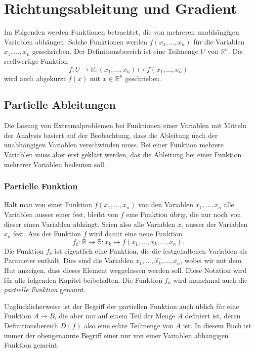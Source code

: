 %
%
%
\section{Richtungsableitung und Gradient
\label{buch:fuvar:section:richtungsableitung}}
Im Folgenden werden Funktionen betrachtet, die von mehreren unabhängigen
Variablen abhängen.
Solche Funktionen werden $f(x_1,\dots,x_n)$ für die Variablen
$x_1,\dots,x_n$ gesschrieben.
Der Definitionsbereich ist eine Teilmenge $U$ von $\mathbb{R}^n$.
Die reellwertige Funktion
\[
f\colon U\to\mathbb{R} : (x_1,\dots,x_n) \mapsto f(x_1,\dots, x_n)
\]
wird auch abgekürzt $f(x)$ mit $x\in\mathbb{R}^n$ geschrieben.

%
%
\subsection{Partielle Ableitungen}
Die Lösung von Extremalproblemen bei Funktionen einer Variablen
mit Mitteln der Analysis basiert auf der Beobachtung, dass die Ableitung
nach der unabhängigen Variablen verschwinden muss.
Bei einer Funktion mehrere Variablen muss aber erst geklärt werden,
das die Ableitung bei einer Funktion mehrerer Variablen bedeuten soll.

%
%
\subsubsection{Partielle Funktion}
Hält man von einer Funktion $f(x_1,\dots,x_n)$ von den Variablen
$x_1,\dots,x_n$ alle Variablen ausser einer fest, bleibt von $f$ eine
Funktion übrig, die nur noch von dieser einen Variablen abhängt.
Seien also alle Variablen $x_i$ ausser der Variablen $x_k$ fest.
Aus der Funktion $f$ wird damit eine neue Funktion
\[
f_k
\colon
\mathbb{R} \to \mathbb{R}
:
x_k \mapsto f(x_1,\dots,x_k,\dots,x_n).
\]
Die Funktion $f_k$ ist eigentlich eine Funktion, die die festgehaltenen
Variablen als Parameter enthält.
Dies sind die Variablen $x_1,\dots,\widehat{x_k},\dots,x_n$, wobei
wir mit dem Hut anzeigen, dass dieses Element weggelassen werden soll.
Diese Notation wird für alle folgenden Kapitel beibehalten.
Die Funktion $f_k$ wird manchmal auch die {\em partielle Funktion}
%
%
genannt.

Unglücklicherweise ist der Begriff der partiellen Funktion auch 
üblich für eine Funktion $A\to B$, die aber nur auf einem Teil
der Menge $A$ definiert ist, deren Definitionsbereich $D(f)$ also
eine echte Teilmenge von $A$ ist.
In diesem Buch ist immer der obengenannte Begriff einer nur von einer
Variablen abhängigen Funktion gemeint.

